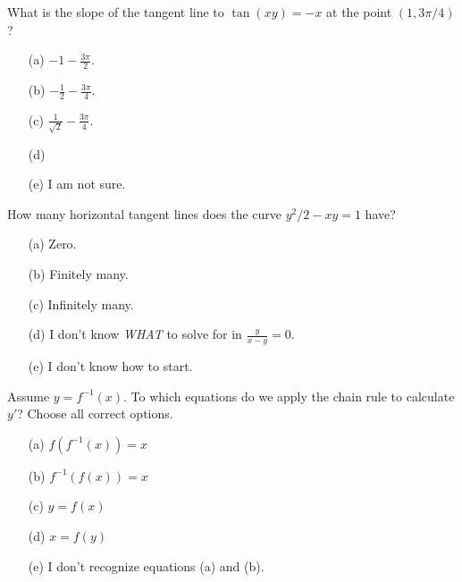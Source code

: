 \documentclass[14pt]{beamer}
\begin{document}
\begin{frame}
  What is the slope of the tangent line to \(\tan(xy) = -x\) at the point \((1, 3\pi/4)\)?

  \medskip
  \begin{itemize} \setlength\itemsep{2ex}
    \item[(a)] \(-1 - \frac{3\pi}{2}\). 
    \item[(b)] \(-\frac{1}{2} - \frac{3\pi}{4}\). 
    \item[(c)] \(\frac{1}{\sqrt{2}} - \frac{3\pi}{4}\). 
    \item[(d)] 
    \item[(e)] I am not sure.
  \end{itemize} 
\end{frame}


\begin{frame}
  How many horizontal tangent lines does the curve \(y^{2}/2 - xy = 1\) have? 

  \medskip
  \begin{itemize} \setlength\itemsep{2ex}
    \item[(a)] Zero.
    \item[(b)] Finitely many.
    \item[(c)] Infinitely many.
    \item[(d)] I don't know \emph{WHAT} to solve for in \(\tfrac{y}{x - y} = 0\).
    \item[(e)] I don't know how to start.
  \end{itemize} 
\end{frame}


\begin{frame}
  Assume \(y = f^{-1}(x)\). To which equations do we apply the chain rule to calculate \(y'\)? Choose all correct options.

  \medskip
  \begin{itemize} \setlength\itemsep{2ex}
    \item[(a)] \(f(f^{-1}(x)) = x\)
    \item[(b)] \(f^{-1}(f(x)) = x\)
    \item[(c)] \(y = f(x)\)
    \item[(d)] \(x = f(y)\)
    \item[(e)] I don't recognize equations (a) and (b).
  \end{itemize} 
\end{frame}
\end{document}
